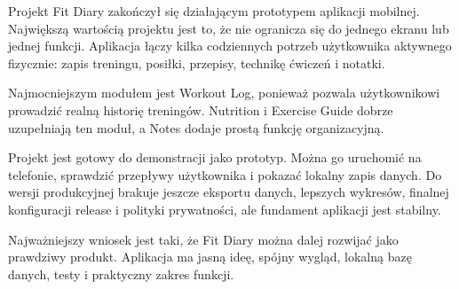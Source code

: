 \documentclass[12pt,a4paper]{article}
\begin{document}
Projekt Fit Diary zakończył się działającym prototypem aplikacji mobilnej. Największą wartością projektu jest to, że nie ogranicza się do jednego ekranu lub jednej funkcji. Aplikacja łączy kilka codziennych potrzeb użytkownika aktywnego fizycznie: zapis treningu, posiłki, przepisy, technikę ćwiczeń i notatki.

Najmocniejszym modułem jest Workout Log, ponieważ pozwala użytkownikowi prowadzić realną historię treningów. Nutrition i Exercise Guide dobrze uzupełniają ten moduł, a Notes dodaje prostą funkcję organizacyjną.

Projekt jest gotowy do demonstracji jako prototyp. Można go uruchomić na telefonie, sprawdzić przepływy użytkownika i pokazać lokalny zapis danych. Do wersji produkcyjnej brakuje jeszcze eksportu danych, lepszych wykresów, finalnej konfiguracji release i polityki prywatności, ale fundament aplikacji jest stabilny.

Najważniejszy wniosek jest taki, że Fit Diary można dalej rozwijać jako prawdziwy produkt. Aplikacja ma jasną ideę, spójny wygląd, lokalną bazę danych, testy i praktyczny zakres funkcji.
\end{document}

